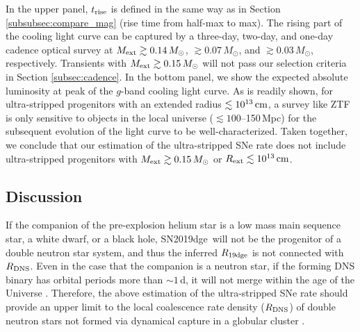 \documentclass[twocolumn]{aastex63}
\newcommand{\name}{SN2019dge}
\begin{document}
In the upper panel, $t_{\rm rise}$ is defined in the same 
way as in Section \ref{subsubsec:compare_mag} (rise time from half-max to max). The rising part of 
the cooling light curve can be captured by a three-day, two-day, and one-day cadence optical survey 
at $M_{\rm ext}\gtrsim 0.14\,M_\odot$, $\gtrsim 0.07\,M_\odot$, and $\gtrsim 0.03\,M_\odot$, 
respectively. Transients with $M_{\rm ext} \gtrsim 0.15\,M_\odot$ will not pass our selection criteria in 
Section \ref{subsec:cadence}. In the bottom panel, we show the expected absolute luminosity at 
peak of the $g$-band cooling light curve. As is readily shown, for ultra-stripped progenitors with an 
extended radius {\color{red}$\lesssim 10^{13}\,{\rm cm}$}, a survey like ZTF is only sensitive to objects
in the local universe ($\lesssim 100$--150\,Mpc) for the subsequent evolution of the light curve to be 
well-characterized. Taken together, we conclude that our estimation of the ultra-stripped SNe rate 
does not include ultra-stripped progenitors with $M_{\rm ext}\gtrsim 0.15\,M_\odot$ or 
{\color{red}$R_{\rm ext}\lesssim 10^{13}\,{\rm cm}$}.  

\subsection{Discussion} 
\label{subsec:companion}
If the companion of the pre-explosion helium star is a low mass main sequence star, a white dwarf, or a 
black hole, \name\ will not be the progenitor of a double neutron star system, and thus the inferred 
$R_{\rm 19dge}$ is not connected with $R_{\rm DNS}$. Even in the case that the companion 
is a neutron star, if the forming DNS binary has orbital periods more than $\sim1$\,d, it will not merge
within the age of the Universe \citep{Tauris2015}. Therefore, the above estimation of the ultra-stripped 
SNe rate should provide an upper limit to the local coalescence rate density ($R_{\rm DNS}$) of double 
neutron stars not formed via dynamical capture in a globular cluster \citep{East2012, Andrews2019}. 

\end{document}
